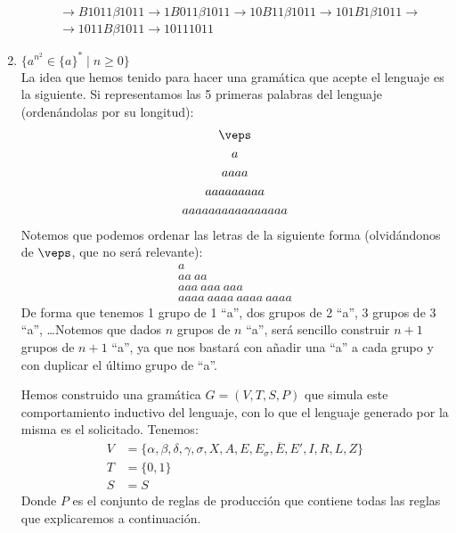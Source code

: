 \begin{ejercicio}
\begin{enumerate}
\begin{align*}
                  &\rightarrow B1011\beta1011 \rightarrow 1B011\beta1011 \rightarrow10B11\beta1011 \rightarrow 101B1\beta1011\rightarrow \\
                  &\rightarrow 1011B\beta1011 \rightarrow10111011
            \end{align*}
        \item $\{a^{n^2} \in \{a\}^{\ast} \mid n\geq 0\}$\\
            La idea que hemos tenido para hacer una gramática que acepte el lenguaje es la siguiente. Si representamos las 5 primeras palabras del lenguaje (ordenándolas por su longitud):
            \begin{gather*}
                \veps \\
                a \\
                aaaa \\
                aaaaaaaaa \\
                aaaaaaaaaaaaaaaa
            \end{gather*}
            Notemos que podemos ordenar las letras de la siguiente forma (olvidándonos de $\veps$, que no será relevante):
            \begin{gather*}
                a \\
                aa\ aa \\
                aaa\ aaa\ aaa\\
                aaaa\ aaaa\ aaaa\ aaaa 
            \end{gather*}
            De forma que tenemos 1 grupo de 1 ``a'', dos grupos de 2 ``a'', 3 grupos de 3 ``a'', \ldots Notemos que dados $n$ grupos de $n$ ``a'', será sencillo construir $n+1$ grupos de $n+1$ ``a'', ya que nos bastará con añadir una ``a'' a cada grupo y con duplicar el último grupo de ``a''.

            Hemos construido una gramática $G = (V, T, S, P)$ que simula este comportamiento inductivo del lenguaje, con lo que el lenguaje generado por la misma es el solicitado. Tenemos:
            \begin{align*}
                V &= \{\alpha, \beta, \delta, \gamma, \sigma, X, A, E, E_{\sigma}, \overline{E}, E', I, R, L, Z \} \\
                T &= \{0,1\} \\
                S &= S
            \end{align*}
            Donde $P$ es el conjunto de reglas de producción que contiene todas las reglas que explicaremos a continuación.


\end{enumerate}
\end{ejercicio}
